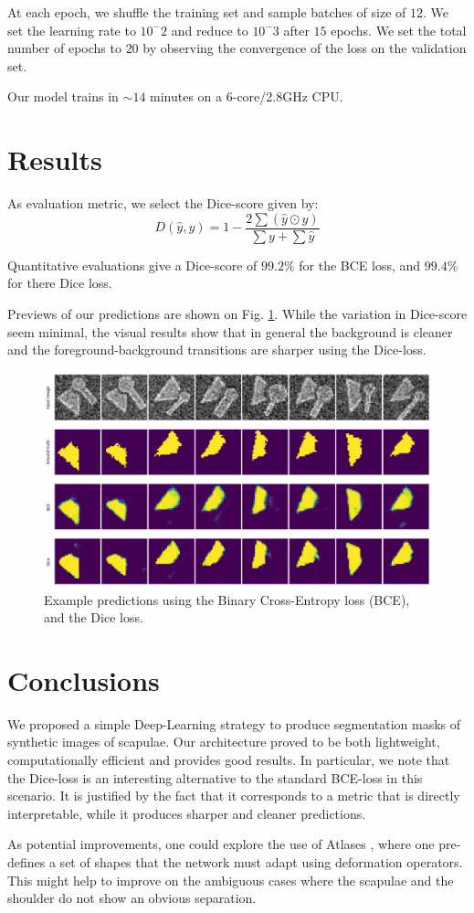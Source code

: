 \documentclass[11pt]{article}
\begin{document}
At each epoch, we shuffle the training set and sample batches of size of \(12\).
We set the learning rate to \(10^-2\) and reduce to \(10^-3\) after \(15\) epochs.
We set the total number of epochs to \(20\) by observing the convergence of the loss
on the validation set.

Our model trains in \(\sim 14\) minutes on a 6-core/2.8GHz CPU.

\section{Results}
\label{sec:orgefab88f}

As evaluation metric, we select the Dice-score given by:
\[
D(\hat{y}, y) = 1 - \frac{2 \sum(\hat{y} \odot y)}{\sum y + \sum \hat{y}}
\]

Quantitative evaluations give a Dice-score of \(99.2\%\) for the BCE loss, and \(99.4\%\) for there
Dice loss.

Previews of our predictions are shown on Fig. \ref{fig:test_prev}.
While the variation in Dice-score seem minimal, the visual results show that in general
the background is cleaner and the foreground-background transitions are sharper
using the Dice-loss.

\begin{figure}[htbp]
\centering
\includegraphics[width=.9\linewidth]{./test.png}
\caption{\label{fig:test_prev}Example predictions using the Binary Cross-Entropy loss (BCE), and the Dice loss.}
\end{figure}

\section{Conclusions}
\label{sec:org114d043}

We proposed a simple Deep-Learning strategy to produce segmentation masks of synthetic
images of scapulae.
Our architecture proved to be both lightweight, computationally efficient and
provides good results.
In particular, we note that the Dice-loss is an interesting alternative to the
standard BCE-loss in this scenario. It is justified by the fact that it corresponds
to a metric that is directly interpretable, while it produces sharper and cleaner predictions.

As potential improvements, one could explore the use of Atlases \cite{vakalopoulou18},
where one pre-defines a set of shapes that the network must adapt using deformation operators.
This might help to improve on the ambiguous cases where the scapulae and the shoulder do
not show an obvious separation.


\printbibliography
\end{document}
